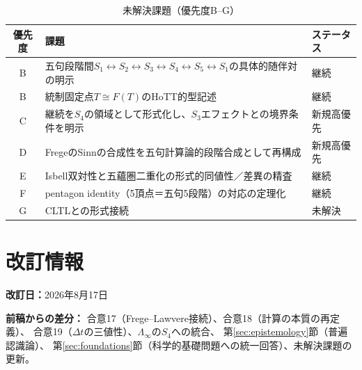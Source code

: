\documentclass[11pt,a4paper]{ltjsarticle}
\theoremstyle{remark}
\newcommand{\dt}{\Delta t}
\newcommand{\LawvereInfinity}{\Lambda_\infty}
\begin{document}
\begin{table}[htbp]
\centering
\caption{未解決課題（優先度B--G）}
\small
\begin{tabularx}{\textwidth}{@{}c >{\raggedright\arraybackslash}X >{\raggedright\arraybackslash}p{}@{}}
\toprule
優先度 & 課題 & ステータス \\
\midrule
B & 五句段階間$S_1\leftrightarrow S_2\leftrightarrow S_3\leftrightarrow S_4\leftrightarrow S_5\leftrightarrow S_1$の具体的随伴対の明示 & 継続 \\
B & 統制固定点$T\cong F(T)$のHoTT的型記述 & 継続 \\
C & 継続を$S_4$の領域として形式化し、$S_3$エフェクトとの境界条件を明示 & 新規高優先 \\
D & FregeのSinnの合成性を五句計算論的段階合成として再構成 & 新規高優先 \\
E & Isbell双対性と五蘊圏二重化の形式的同値性／差異の精査 & 継続 \\
F & pentagon identity（5頂点＝五句5段階）の対応の定理化 & 継続 \\
G & CLTLとの形式接続 & 未解決 \\
\bottomrule
\end{tabularx}
\end{table}

\section*{改訂情報}

\noindent\textbf{改訂日：}2026年8月17日

\noindent\textbf{前稿からの差分：}
合意17（Frege--Lawvere接続）、合意18（計算の本質の再定義）、
合意19（$\dt$の三値性）、$\LawvereInfinity$の$S_4$への統合、
第\ref{sec:epistemology}節（普遍認識論）、
第\ref{sec:foundations}節（科学的基礎問題への統一回答）、未解決課題の更新。
\end{document}

